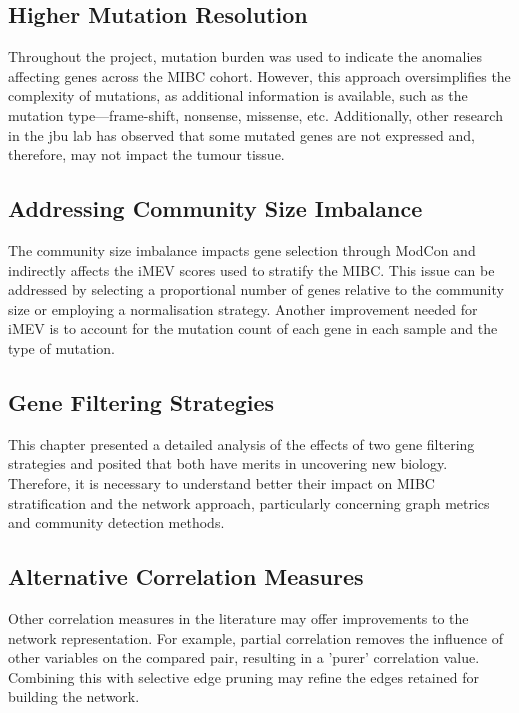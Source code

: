 \subsection*{Higher Mutation Resolution}

Throughout the project, mutation burden was used to indicate the anomalies affecting genes across the MIBC cohort. However, this approach oversimplifies the complexity of mutations, as additional information is available, such as the mutation type—frame-shift, nonsense, missense, etc. Additionally, other research in the \acrlong{jbu} lab has observed that some mutated genes are not expressed and, therefore, may not impact the tumour tissue.

\subsection*{Addressing Community Size Imbalance}

The community size imbalance impacts gene selection through ModCon and indirectly affects the iMEV scores used to stratify the MIBC. This issue can be addressed by selecting a proportional number of genes relative to the community size or employing a normalisation strategy. Another improvement needed for iMEV is to account for the mutation count of each gene in each sample and the type of mutation.

\subsection*{Gene Filtering Strategies}

This chapter presented a detailed analysis of the effects of two gene filtering strategies and posited that both have merits in uncovering new biology. Therefore, it is necessary to understand better their impact on MIBC stratification and the network approach, particularly concerning graph metrics and community detection methods.

\subsection*{Alternative Correlation Measures}

Other correlation measures in the literature may offer improvements to the network representation. For example, partial correlation removes the influence of other variables on the compared pair, resulting in a 'purer' correlation value. Combining this with selective edge pruning may refine the edges retained for building the network.


